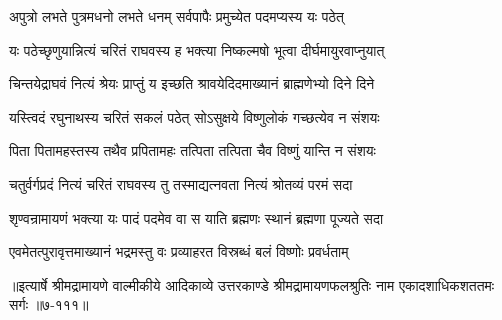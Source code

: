\twolineshloka
{अपुत्रो लभते पुत्रमधनो लभते धनम्}
{सर्वपापैः प्रमुच्येत पदमप्यस्य यः पठेत्} %

\twolineshloka
{यः पठेच्छृणुयान्नित्यं चरितं राघवस्य ह}
{भक्त्या निष्कल्मषो भूत्वा दीर्घमायुरवाप्नुयात्} %

\twolineshloka
{चिन्तयेद्राघवं नित्यं श्रेयः प्राप्तुं य इच्छति}
{श्रावयेदिदमाख्यानं ब्राह्मणेभ्यो दिने दिने} %

\twolineshloka
{यस्त्विदं रघुनाथस्य चरितं सकलं पठेत्}
{सोऽसुक्षये विष्णुलोकं गच्छत्येव न संशयः} %

\twolineshloka
{पिता पितामहस्तस्य तथैव प्रपितामहः}
{तत्पिता तत्पिता चैव विष्णुं यान्ति न संशयः} %

\twolineshloka
{चतुर्वर्गप्रदं नित्यं चरितं राघवस्य तु}
{तस्माद्यत्नवता नित्यं श्रोतव्यं परमं सदा} %

\twolineshloka
{शृण्वन्रामायणं भक्त्या यः पादं पदमेव वा}
{स याति ब्रह्मणः स्थानं ब्रह्मणा पूज्यते सदा} %

\twolineshloka
{एवमेतत्पुरावृत्तमाख्यानं भद्रमस्तु वः}
{प्रव्याहरत विस्रब्धं बलं विष्णोः प्रवर्धताम्} %


॥इत्यार्षे श्रीमद्रामायणे वाल्मीकीये आदिकाव्ये उत्तरकाण्डे श्रीमद्रामायणफलश्रुतिः नाम एकादशाधिकशततमः सर्गः ॥७-१११॥

